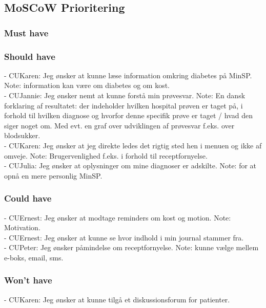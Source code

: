 \subsection{MoSCoW Prioritering}
\subsubsection{Must have}
\subsubsection{Should have}
%
%
- CUKaren: Jeg ønsker at kunne læse information omkring diabetes på MinSP. Note: information kan være om diabetes og om kost.\\ %
%
- CUJannie: Jeg ønsker nemt at kunne forstå min prøvesvar. Note: En dansk forklaring af resultatet: der indeholder hvilken hospital prøven er taget på, i forhold til hvilken diagnose og hvorfor denne specifik prøve er taget / hvad den siger noget om. Med evt. en graf over udviklingen af prøvesvar f.eks. over blodsukker.\\
- CUKaren: Jeg ønsker at jeg direkte ledes det rigtig sted hen i menuen og ikke af omveje. Note: Brugervenlighed f.eks. i forhold til receptfornyelse.\\ 
- CUJulia: Jeg ønsker at oplysninger om mine diagnoser er adskilte. Note: for at opnå en mere personlig MinSP.\\
\subsubsection{Could have}
- CUErnest: Jeg ønsker at modtage reminders om kost og motion. Note: Motivation. \\
- CUErnest: Jeg ønsker at kunne se hvor indhold i min journal stammer fra.\\
- CUPeter: Jeg ønsker påmindelse om receptfornyelse. Note: kunne vælge mellem e-boks, email, sms.\\
\subsubsection{Won't have}
- CUKaren: Jeg ønsker at kunne tilgå et diskussionsforum for patienter.\\ %